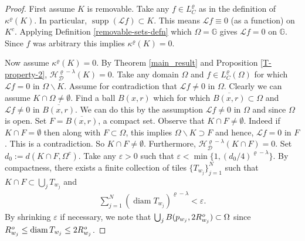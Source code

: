 \documentclass[12pt,a4paper,reqno]{amsart}
\DeclareMathOperator{\supp}{supp}
\renewcommand{\L}{\mathcal{L}}
\renewcommand{\k}{\kappa}
\newcommand{\out}{{\it o}}
\newcommand{\Rout}{R^{\out}}
\renewcommand{\l}{\lambda}
\newcommand{\G}{\mathbb{G}}
\newcommand{\diam}{\operatorname{diam}}
\numberwithin{equation}{section}
\theoremstyle{definition}
\begin{document}
\begin{proof}
First assume $K$ is removable. Take any $f \in L_C^{\varrho}$ as in the definition of $\k^{\varrho}(K)$. In particular, $\supp (\L f) \subset K$. This means $\L f \equiv 0$ (as a function) on $K^c$. Applying Definition \ref{removable-sets-defn} which $\Omega = \G$ gives $\L f = 0$ on $\G$. Since $f$ was arbitrary this implies $\k^{\varrho}(K) = 0$.


Now assume $\k^{\varrho}(K) = 0$. By Theorem \ref{main_result} and Proposition \ref{T-property-2}, $\mathcal{H}_{\mathcal{D}}^{\varrho-\l}(K) = 0$. Take any domain $\Omega$ and $f \in L_C^{\varrho}(\Omega)$ for which $\L f = 0$ in $\Omega \backslash K$. Assume for contradiction that $\L f \neq 0$ in $\Omega$. Clearly we can assume $K \cap \Omega \neq \emptyset$. Find a ball $B(x,r)$ which for which $\overline{B(x,r)} \subset \Omega$ and $\L f \neq 0$ in $\overline{B(x,r)}$. We can do this by the assumption $\L f \neq 0$ in $\Omega$ and since $\Omega$ is open. Set $F = \overline{B(x,r)}$, a compact set. Observe that $K \cap F \neq \emptyset$. Indeed if $K \cap F = \emptyset$ then along with $F \subset \Omega$, this implies $\Omega \backslash K \supset F$ and hence, $\L f =0$ in $F$. This is a contradiction. So $K \cap F \neq \emptyset$. Furthermore, $\mathcal{H}_{\mathcal{D}}^{\varrho -\l}(K \cap F) = 0$. Set $d_0 := d(K \cap F , \Omega^c)$. Take any $\varepsilon > 0$ such that $\varepsilon < \min\{1, (d_0/4)^{\varrho-\l}\}$. By compactness, there exists a finite collection of tiles $\{ T_{w_j}\}_{{j=1}}^N$ such that $K \cap F \subset \bigcup_j T_{w_j}$ and \begin{align*}
    \sum_{j=1}^N (\diam T_{w_j})^{\varrho -\l} < \varepsilon.
\end{align*}
By shrinking $\varepsilon$ if necessary, we note that $\bigcup_j B(p_{w_j}, 2\Rout_{w_j}) \subset \Omega$ since $\Rout_{w_j} \leq \diam T_{w_j} \leq 2\Rout_{w_j}$.


\end{proof}
\end{document}
